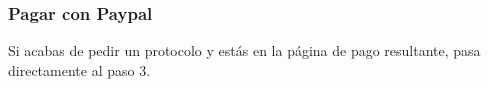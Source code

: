 \documentclass[12pt, spanish]{article}
\begin{document}
\begin{steps}
            \medskip
            \begin{minipage}[t]{\linewidth}
            \raggedright
        \end{minipage}

    \end{steps}


    \subsubsection{Pagar con Paypal}

    \label{sec:paypal}

        Si acabas de pedir un protocolo y estás en la página de pago resultante, pasa directamente
    al paso 3.
\end{document}
